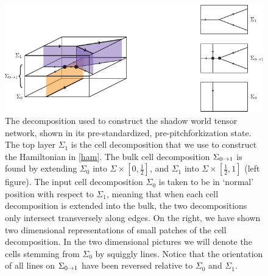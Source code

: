 \begin{figure}
\begin{center}
\includegraphics{CellDecomposition.pdf}
\caption{\label{CellDecomposition}
  
The decomposition used to construct the shadow world tensor network, shown 
in its pre-standardized, pre-pitchforkization state.
The top layer $\Sigma_1$ is the cell decomposition that we use to construct the Hamiltonian in \eqref{ham}.
The bulk cell decomposition $\Sigma_{0\rightarrow1}$ is found by extending $\Sigma_0$ into 
$\Sigma \times [0,\frac{1}{2}]$, and $\Sigma_{1}$ into $\Sigma \times [\frac{1}{2},1]$ (left figure).
The input cell decomposition $\Sigma_0$ is taken to be in `normal' position with respect to $\Sigma_1$, meaning that when each cell decomposition is extended into the bulk, the two decompositions only intersect transversely along edges. 
On the right, we have shown two dimensional representations of small patches of the cell decomposition. 
In the two dimensional pictures we will denote the cells stemming from $\Sigma_0$ by squiggly lines.
Notice that the orientation of all lines on $\Sigma_{0 \rightarrow1}$ have been reversed relative to $\Sigma_0$ and $\Sigma_1$. 
}
\end{center}
\end{figure}

